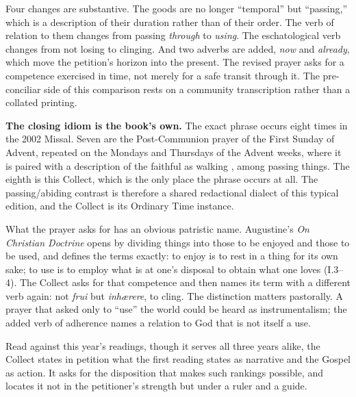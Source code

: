 Four changes are substantive. The goods are no longer ``temporal'' but ``passing,'' which is a description of their duration rather than of their order. The verb of relation to them changes from passing \emph{through} to \emph{using}. The eschatological verb changes from not losing to clinging. And two adverbs are added, \emph{now} and \emph{already}, which move the petition's horizon into the present. The revised prayer asks for a competence exercised in time, not merely for a safe transit through it. The pre-conciliar side of this comparison rests on a community transcription rather than a collated printing.

\textbf{The closing idiom is the book's own.} The exact phrase  occurs eight times in the 2002 Missal. Seven are the Post-Communion prayer of the First Sunday of Advent, repeated on the Mondays and Thursdays of the Advent weeks, where it is paired with a description of the faithful as walking , among passing things. The eighth is this Collect, which is the only place the phrase  occurs at all. The passing/abiding contrast is therefore a shared redactional dialect of this typical edition, and the Collect is its Ordinary Time instance.

What the prayer asks for has an obvious patristic name. Augustine's \emph{On Christian Doctrine} opens by dividing things into those to be enjoyed and those to be used, and defines the terms exactly: to enjoy is to rest in a thing for its own sake; to use is to employ what is at one's disposal to obtain what one loves (I.3--4). The Collect asks for that competence and then names its term with a different verb again: not \emph{frui} but \emph{inhærere}, to cling. The distinction matters pastorally. A prayer that asked only to ``use'' the world could be heard as instrumentalism; the added verb of adherence names a relation to God that is not itself a use.

Read against this year's readings, though it serves all three years alike, the Collect states in petition what the first reading states as narrative and the Gospel as action. It asks for the disposition that makes such rankings possible, and locates it not in the petitioner's strength but under a ruler and a guide.
